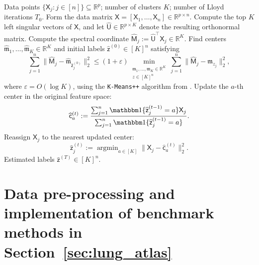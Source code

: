\documentclass[10pt]{article}
\newcommand{\R}{\mathbb R}
\DeclareMathOperator{\argmin}{\arg\min}
\begin{document}
\begin{algorithm}[tb]
\caption{\(\mathsf{TClust}\): Spectral Initialization Followed by Lloyd Refinement}
\label{alg:tclust}
\begin{algorithmic}[1]
\Require
Data points \(\{\mathsf{X}_j:j\in[n]\}\subseteq\R^p\); number of clusters \(K\); number of Lloyd iterations \(T_0\).
\State Form the data matrix
\(\mathsf{X}=[\mathsf{X}_1,\ldots,\mathsf{X}_n]\in\R^{p\times n}\).
\State Compute the top \(K\) left singular vectors of \(\mathsf{X}\), and let
\(\widehat{\mathsf{U}}\in\R^{p\times K}\) denote the resulting orthonormal matrix.
    \State Compute the spectral coordinate
    \(\widehat{\mathsf M}_j:=\widehat{\mathsf{U}}^\top \mathsf{X}_j\in\R^K\).
\EndFor
\State Find centers \(\widehat{\mathfrak m}_1,\ldots,\widehat{\mathfrak m}_K\in\R^K\)
and initial labels \(\widehat{\mathsf z}^{(0)}\in[K]^n\) satisfying
\[
    \sum_{j=1}^n
    \|\widehat{\mathsf M}_j-\widehat{\mathfrak m}_{\widehat{\mathsf z}^{(0)}_j}\|_2^2
    \le
    (1+\varepsilon)
    \min_{\substack{\mathfrak m_1,\ldots,\mathfrak m_K\in\R^K\\ z\in[K]^n}}
    \sum_{j=1}^n
    \|\widehat{\mathsf M}_j-\mathfrak m_{z_j}\|_2^2,
\]
where $\varepsilon=O(\log K)$, using the \texttt{K-Means++} algorithm from \citet{arthur2007k}.
        \State Update the \(a\)-th center in the original feature space:
        \[
            \widehat{\mathsf c}_a^{(t)}
            :=
            \frac{
                \sum_{j=1}^n
                \mathbbm 1\{\widehat{\mathsf z}^{(t-1)}_j=a\}\mathsf X_j
            }{
                \sum_{j=1}^n
                \mathbbm 1\{\widehat{\mathsf z}^{(t-1)}_j=a\}
            }.
        \]
    \EndFor
        \State Reassign \(\mathsf X_j\) to the nearest updated center:
        \[
            \widehat{\mathsf z}^{(t)}_j
            :=
            \argmin_{a\in[K]}
            \|\mathsf X_j-\widehat{\mathsf c}_a^{(t)}\|_2^2.
        \]
    \EndFor
\EndFor
\Output Estimated labels \(\widehat{\mathsf z}^{(T)}\in[K]^n\).
\end{algorithmic}
\end{algorithm}

\section{Data pre-processing and implementation of benchmark methods in Section~\ref{sec:lung_atlas}}
\end{document}
